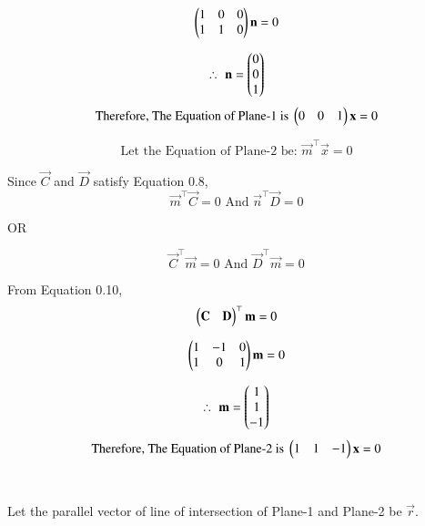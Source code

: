 \documentclass[journal]{IEEEtran}
\begin{document}
\begin{equation}
    \begin{pmatrix} 1 & 0 & 0 \\ 1 & 1 & 0\end{pmatrix} \mathbf{n}= 0
\end{equation}

\begin{equation}
    \therefore \, \, \mathbf{n} = \begin{pmatrix}0 \\ 0 \\ 1\end{pmatrix}
\end{equation}
\begin{equation}
    \text{Therefore, The Equation of Plane-1 is } \begin{pmatrix}0 & 0 & 1\end{pmatrix}\mathbf{x} = 0
\end{equation}


\begin{equation}
\text{Let the Equation of Plane-2 be: } \vec{m}^\top\vec{x}=0
\end{equation}

Since $\vec{C}$ and $\vec{D}$ satisfy Equation 0.8,
\begin{equation}
    \vec{m}^\top\vec{C}=0 \text{ And } \vec{n}^\top\vec{D}=0
\end{equation}

\begin{center}
    OR
\end{center}

\begin{equation}
    \vec{C}^\top\vec{m}=0 \text{ And } \vec{D}^\top\vec{m}=0
\end{equation}

From Equation 0.10,
\begin{equation}
    \begin{pmatrix}\mathbf{C} & \mathbf{D}\end{pmatrix}^\top \mathbf{m} = 0
\end{equation}

\begin{equation}
    \begin{pmatrix} 1 & -1 & 0 \\ 1 & 0 & 1\end{pmatrix} \mathbf{m}= 0
\end{equation}

\begin{equation}
    \therefore \, \, \mathbf{m} = \begin{pmatrix}1 \\ 1 \\ -1\end{pmatrix}
\end{equation}
\begin{equation}
    \text{Therefore, The Equation of Plane-2 is } \begin{pmatrix}1 & 1 & -1\end{pmatrix}\mathbf{x} = 0
\end{equation}\\\\

Let the parallel vector of line of intersection of Plane-1 and Plane-2 be $\vec{r}$.\\
\end{document}
